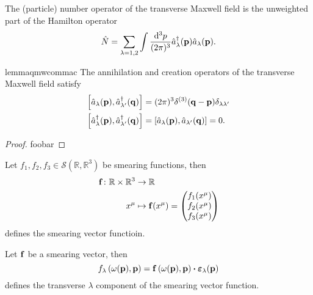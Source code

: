 \begin{definition}\label{thm:qmw_number}
	The (particle) number operator of the transverse Maxwell field is the unweighted part of the Hamilton operator
	\begin{equation}
		\label{eq:qmw_number}
		\hat{N}
		=
		\sum_{\lambda=1,2}
		\int\frac{\dd[3]{p}}{(2\pi)^3}
		\hat{a}_\lambda^\dagger(\vb{p})
		\hat{a}_\lambda(\vb{p})
		.
	\end{equation}
\end{definition}
\begin{restatable}{lemma}{qmwcommac}\label{thm:qmw_comm_ac}
	The annihilation and creation operators of the transverse Maxwell field satisfy
	\begin{align}
		\label{eq:qmw_comm_ac}
		\comm{\hat{a}_\lambda(\vb{p})}{\hat{a}_{\lambda^\prime}^\dagger(\vb{q})}
		&=
		(2\pi)^3
		\delta^{(3)}(\vb{q}-\vb{p})
		\delta_{\lambda\lambda^\prime}
		\\
		\comm{\hat{a}_\lambda^\dagger(\vb{p})}{\hat{a}_{\lambda^\prime}^\dagger(\vb{q})}
		&=
		\comm{\hat{a}_\lambda(\vb{p})}{\hat{a}_{\lambda^\prime}(\vb{q})}
		=
		0
		.
	\end{align}
\end{restatable}
\begin{proof}
	foobar
\end{proof}

\begin{definition}
	Let $f_1,f_2,f_3\in\mathcal{S}(\mathbb{R},\mathbb{R}^3)$ be smearing functions, then
	\begin{equation}
		\begin{split}
			\vb{f}
			\colon
			\mathbb{R}\times \mathbb{R}^3
			&\to
			\mathbb{R}
			\\
			x^\mu
			&\mapsto
			\vb{f}(x^\mu)
			=
			\begin{pmatrix}
				f_1(x^\mu) \\
				f_2(x^\mu) \\
				f_3(x^\mu)				
			\end{pmatrix}
		\end{split}
	\end{equation}
	defines the smearing vector functioin.
\end{definition}
\begin{definition}
	Let $\vb{f}$ be a smearing vector, then
	\begin{equation}
		\label{eq:qmw_transverse_smearing_function}
		f_\lambda\left(\omega(\vb{p}),\vb{p}\right)
		=
		\vb{f}\left(\omega(\vb{p}),\vb{p}\right)
		\vdot
		\boldsymbol{\varepsilon}_\lambda(\vb{p})
	\end{equation}
	defines the transverse $\lambda$ component of the smearing vector function.
\end{definition}

